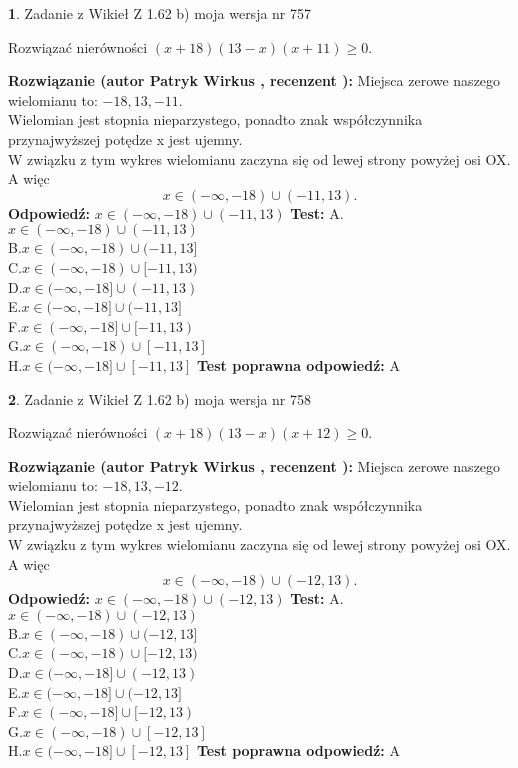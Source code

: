 \documentclass[12pt, a4paper]{article}
\theoremstyle{definition} %
\newtheorem{zad}{}
\newcommand{\zadStart}[1]{\begin{zad}#1\newline}
\newcommand{\zadStop}{\end{zad}}
\newcommand{\rozwStart}[2]{\noindent \textbf{Rozwiązanie (autor #1 , recenzent #2): }\newline}
\newcommand{\rozwStop}{\newline}
\newcommand{\odpStart}{\noindent \textbf{Odpowiedź:}\newline}
\newcommand{\odpStop}{\newline}
\newcommand{\testStart}{\noindent \textbf{Test:}\newline}
\newcommand{\testStop}{\newline}
\newcommand{\kluczStart}{\noindent \textbf{Test poprawna odpowiedź:}\newline}
\newcommand{\kluczStop}{\newline}
\begin{document}
\zadStart{Zadanie z Wikieł Z 1.62 b) moja wersja nr 757}

Rozwiązać nierówności $(x+18)(13-x)(x+11)\ge0$.
\zadStop
\rozwStart{Patryk Wirkus}{}
Miejsca zerowe naszego wielomianu to: $-18, 13, -11$.\\
Wielomian jest stopnia nieparzystego, ponadto znak współczynnika przy\linebreak najwyższej potędze x jest ujemny.\\ W związku z tym wykres wielomianu zaczyna się od lewej strony powyżej osi OX. A więc $$x \in (-\infty,-18) \cup (-11,13).$$
\rozwStop
\odpStart
$x \in (-\infty,-18) \cup (-11,13)$
\odpStop
\testStart
A.$x \in (-\infty,-18) \cup (-11,13)$\\
B.$x \in (-\infty,-18) \cup (-11,13]$\\
C.$x \in (-\infty,-18) \cup [-11,13)$\\
D.$x \in (-\infty,-18] \cup (-11,13)$\\
E.$x \in (-\infty,-18] \cup (-11,13]$\\
F.$x \in (-\infty,-18] \cup [-11,13)$\\
G.$x \in (-\infty,-18) \cup [-11,13]$\\
H.$x \in (-\infty,-18] \cup [-11,13]$
\testStop
\kluczStart
A
\kluczStop



\zadStart{Zadanie z Wikieł Z 1.62 b) moja wersja nr 758}

Rozwiązać nierówności $(x+18)(13-x)(x+12)\ge0$.
\zadStop
\rozwStart{Patryk Wirkus}{}
Miejsca zerowe naszego wielomianu to: $-18, 13, -12$.\\
Wielomian jest stopnia nieparzystego, ponadto znak współczynnika przy\linebreak najwyższej potędze x jest ujemny.\\ W związku z tym wykres wielomianu zaczyna się od lewej strony powyżej osi OX. A więc $$x \in (-\infty,-18) \cup (-12,13).$$
\rozwStop
\odpStart
$x \in (-\infty,-18) \cup (-12,13)$
\odpStop
\testStart
A.$x \in (-\infty,-18) \cup (-12,13)$\\
B.$x \in (-\infty,-18) \cup (-12,13]$\\
C.$x \in (-\infty,-18) \cup [-12,13)$\\
D.$x \in (-\infty,-18] \cup (-12,13)$\\
E.$x \in (-\infty,-18] \cup (-12,13]$\\
F.$x \in (-\infty,-18] \cup [-12,13)$\\
G.$x \in (-\infty,-18) \cup [-12,13]$\\
H.$x \in (-\infty,-18] \cup [-12,13]$
\testStop
\kluczStart
A
\kluczStop
\end{document}
